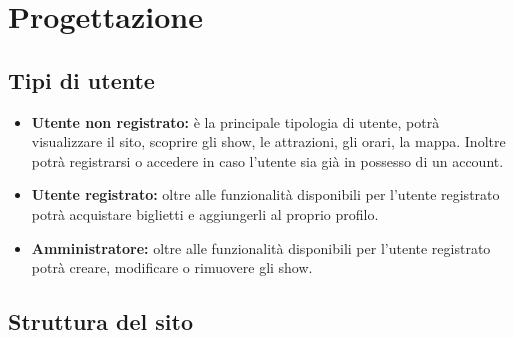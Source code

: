 \section{Progettazione}

\subsection{Tipi di utente}
\begin{itemize}
    \item \textbf{Utente non registrato:} è la principale tipologia di utente, potrà visualizzare il sito, scoprire gli show, le attrazioni, gli orari, la mappa. Inoltre potrà registrarsi o accedere in caso l'utente sia già in possesso di un account.
    \item \textbf{Utente registrato:} oltre alle funzionalità disponibili per l'utente registrato potrà acquistare biglietti e aggiungerli al proprio profilo.
    \item \textbf{Amministratore:} oltre alle funzionalità disponibili per l'utente registrato potrà creare, modificare o rimuovere gli show.
\end{itemize}

\subsection{Struttura del sito}
